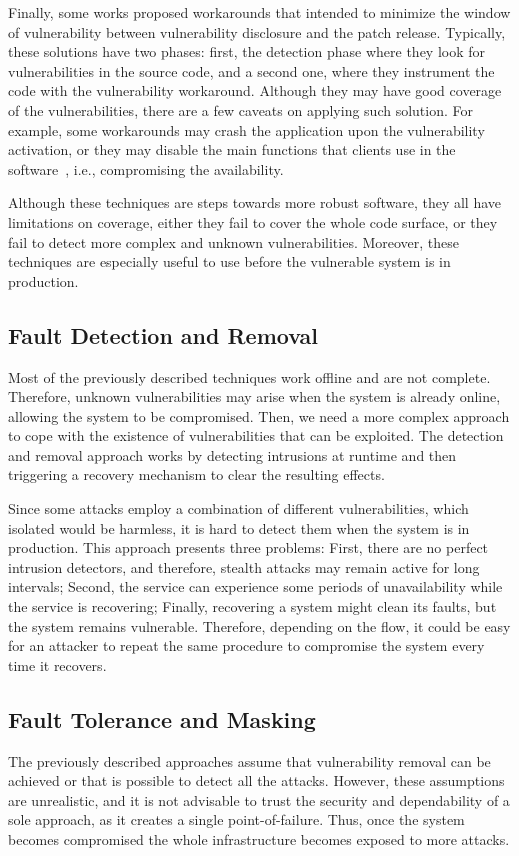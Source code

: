 Finally, some works proposed workarounds that intended to minimize the window of vulnerability between vulnerability disclosure and the patch release.
Typically, these solutions have two phases: first, the detection phase where they look for vulnerabilities in the source code, and a second one, where they instrument the code with the vulnerability workaround.
Although they may have good coverage of the vulnerabilities, there are a few caveats on applying such solution.
For example, some workarounds may crash the application upon the vulnerability activation, or they may disable the main functions that clients use in the software~\cite{Huang:2016}, i.e., compromising the availability. 


Although these techniques are steps towards more robust software, they all have limitations on coverage, either they fail to cover the whole code surface, or they fail to detect more complex and unknown vulnerabilities.
Moreover, these techniques are especially useful to use before the vulnerable system is in production.


\subsection{Fault Detection and Removal}
Most of the previously described techniques work offline and are not complete. 
Therefore, unknown vulnerabilities may arise when the system is already online, allowing the system to be compromised.
Then, we need a more complex approach to cope with the existence of vulnerabilities that can be exploited.
The detection and removal approach works by detecting intrusions at runtime and then triggering a recovery mechanism to clear the resulting effects. 

Since some attacks employ a combination of different vulnerabilities, which isolated would be harmless, it is hard to detect them when the system is in production. 
This approach presents three problems: 
First, there are no perfect intrusion detectors, and therefore, stealth attacks may remain active for long intervals; 
Second, the service can experience some periods of unavailability while the service is recovering; 
Finally, recovering a system might clean its faults, but the system remains vulnerable.
Therefore, depending on the flow, it could be easy for an attacker to repeat the same procedure to compromise the system every time it recovers.


\subsection{Fault Tolerance and Masking}
The previously described approaches assume that vulnerability removal can be achieved or that is possible to detect all the attacks.
However, these assumptions are unrealistic, and it is not advisable to trust the security and dependability of a sole approach, as it creates a single point-of-failure. 
Thus, once the system becomes compromised the whole infrastructure becomes exposed to more attacks. 


